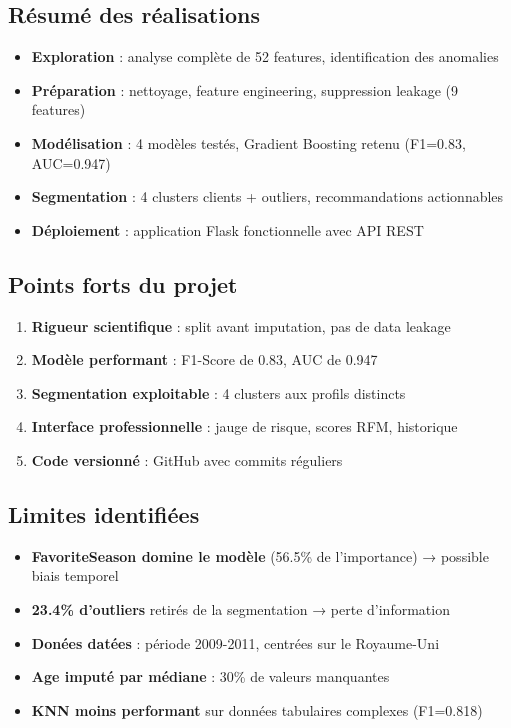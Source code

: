 \documentclass[11pt,a4paper]{article}
\begin{document}
\subsection{Résumé des réalisations}
\begin{tcolorbox}[title=✅ Bilan du projet]
\begin{itemize}
    \item \textbf{Exploration} : analyse complète de 52 features, identification des anomalies
    \item \textbf{Préparation} : nettoyage, feature engineering, suppression leakage (9 features)
    \item \textbf{Modélisation} : 4 modèles testés, Gradient Boosting retenu (F1=0.83, AUC=0.947)
    \item \textbf{Segmentation} : 4 clusters clients + outliers, recommandations actionnables
    \item \textbf{Déploiement} : application Flask fonctionnelle avec API REST
\end{itemize}
\end{tcolorbox}

\subsection{Points forts du projet}
\begin{enumerate}
    \item \textbf{Rigueur scientifique} : split avant imputation, pas de data leakage
    \item \textbf{Modèle performant} : F1-Score de 0.83, AUC de 0.947
    \item \textbf{Segmentation exploitable} : 4 clusters aux profils distincts
    \item \textbf{Interface professionnelle} : jauge de risque, scores RFM, historique
    \item \textbf{Code versionné} : GitHub avec commits réguliers
\end{enumerate}

\subsection{Limites identifiées}
\begin{itemize}
    \item \textbf{FavoriteSeason domine le modèle} (56.5\% de l'importance) → possible biais temporel
    \item \textbf{23.4\% d'outliers} retirés de la segmentation → perte d'information
    \item \textbf{Donées datées} : période 2009-2011, centrées sur le Royaume-Uni
    \item \textbf{Age imputé par médiane} : 30\% de valeurs manquantes
    \item \textbf{KNN moins performant} sur données tabulaires complexes (F1=0.818)
\end{itemize}
\end{document}
